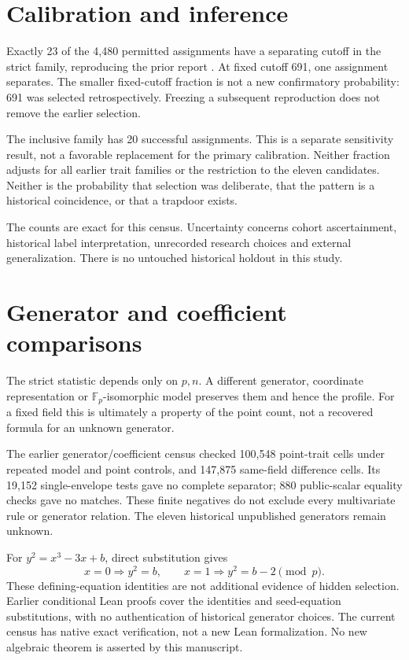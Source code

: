 \documentclass[11pt]{article}
\newcommand{\F}{\mathbb F}
\begin{document}
\section{Calibration and inference}
Exactly 23 of the 4,480 permitted assignments have a separating cutoff
in the strict family, reproducing the prior report
\cite{asanso,strictdata}. At fixed cutoff 691, one assignment separates.
The smaller fixed-cutoff fraction is not a new confirmatory probability:
691 was selected retrospectively. Freezing a subsequent reproduction
does not remove the earlier selection.

The inclusive family has 20 successful assignments. This is a separate
sensitivity result, not a favorable replacement for the primary
calibration. Neither fraction adjusts for all earlier trait families or
the restriction to the eleven candidates. Neither is the probability
that selection was deliberate, that the pattern is a historical
coincidence, or that a trapdoor exists.

The counts are exact for this census. Uncertainty concerns cohort
ascertainment, historical label interpretation, unrecorded research
choices and external generalization. There is no untouched historical
holdout in this study.

\section{Generator and coefficient comparisons}
The strict statistic depends only on $p,n$. A different generator,
coordinate representation or $\F_p$-isomorphic model preserves them
and hence the profile. For a fixed field this is ultimately a property
of the point count, not a recovered formula for an unknown generator.

The earlier generator/coefficient census \cite{generatordata} checked
100,548 point-trait cells under repeated model and point controls,
and 147,875 same-field difference cells. Its 19,152 single-envelope
tests gave no complete separator; 880 public-scalar equality checks
gave no matches. These finite negatives do not exclude every
multivariate rule or generator relation. The eleven historical
unpublished generators remain unknown.

For $y^2=x^3-3x+b$, direct substitution gives
\begin{equation}
 x=0\Longrightarrow y^2=b,\qquad
 x=1\Longrightarrow y^2=b-2\pmod p.
\end{equation}
These defining-equation identities are not additional evidence of
hidden selection. Earlier conditional Lean proofs cover the
identities and seed-equation substitutions, with no authentication of
historical generator choices. The current census has native exact
verification, not a new Lean formalization. No new algebraic theorem
is asserted by this manuscript.
\end{document}
